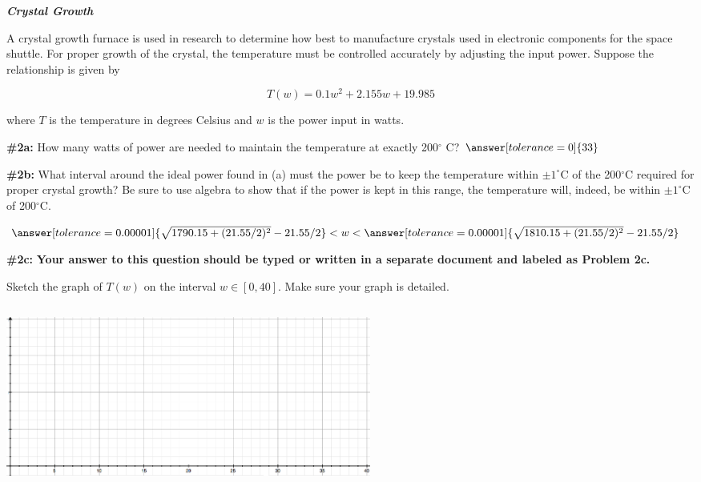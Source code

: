 \documentclass[handout,nooutcomes]{ximera}
\begin{document}
\begin{problem}{\textbf{\textit{Crystal Growth}}}

A crystal growth furnace is used in research to determine how best to manufacture crystals used in electronic components for the space shuttle.  For proper growth of the crystal, the temperature must be controlled accurately by adjusting the input power.  Suppose the relationship is given by

\[T(w)= 0.1 w^2 +2.155 w +19.985
\]

where $T$ is the temperature in degrees Celsius and $w$ is the power input in watts.
   \begin{problem}{\textbf{\#2a:}}
   How many watts of power are needed to maintain the temperature at exactly 200$^\circ$ C?
   $\answer[tolerance=0]{33}$
   \end{problem}
   
   \begin{problem}{\textbf{\#2b:}}
   What interval around the ideal power found in (a) must the power be to keep the temperature within $\pm 1^\circ$C  of the 200$^\circ$C required for proper crystal growth? Be sure to use algebra to show that if the power is kept in this range, the temperature will, indeed, be within $\pm 1^\circ$C  of 200$^\circ$C.
   
   $\answer[tolerance=0.00001]{\sqrt{1790.15+(21.55/2)^2}-21.55/2} <w< \answer[tolerance=0.00001]{\sqrt{1810.15+(21.55/2)^2}-21.55/2}$
   
   \end{problem}
   
   \begin{problem}{\textbf{\#2c:}}
   \textbf{Your answer to this question should be typed or written in a separate document and labeled as Problem 2c.}
   
   Sketch the graph of $T(w)$ on the interval $w\in[0,40]$. Make sure your graph is detailed.
   
	\includegraphics[width=12cm, height=6cm]{Tolerance_crystals_axis2.png}
    \end{problem}
    

\end{problem}
\end{document}

